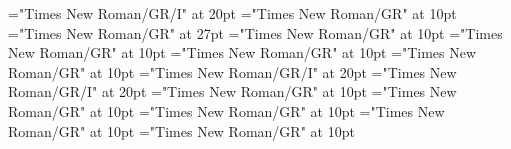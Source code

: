 \documentclass[a4paper]{article}
\begin{document}
\pagestyle{plain}
\sloppy
\setlength{\parfillskip}{0pt plus 1fil}
\font\pronunciationenUKpronunciationbefore="Times New Roman/GR/I" at 20pt
\font\sectionletterdictionary="Times New Roman/GR" at 10pt
\font\headsectionletterdictionary="Times New Roman/GR" at 27pt
\font\articledictionary="Times New Roman/GR" at 10pt
\font\headwordfirstoftypearticledictionary="Times New Roman/GR" at 10pt
\font\grammarrequiresfirstoftypearticledictionary="Times New Roman/GR" at 10pt
\font\relationsynonymfirstoftypearticledictionary="Times New Roman/GR" at 10pt
\font\pronunciationenUKarticledictionary="Times New Roman/GR/I" at 20pt
\font\pronunciationenUSarticledictionary="Times New Roman/GR/I" at 20pt
\font\grammarcategoryfirstoftypearticledictionary="Times New Roman/GR" at 10pt
\font{}="Times New Roman/GR" at 10pt
\font\notefirstoftypearticledictionary="Times New Roman/GR" at 10pt
\font\exampleusearticledictionary="Times New Roman/GR" at 10pt
\font\examplearticledictionary="Times New Roman/GR" at 10pt

\mbox{} 
\newpage 
\newpage 
\setcounter{page}{1} 
\pagestyle{fancy} 
\begin{center}
\end{center}

\pronunciationenUSarticledictionary{, }
\end{document}
